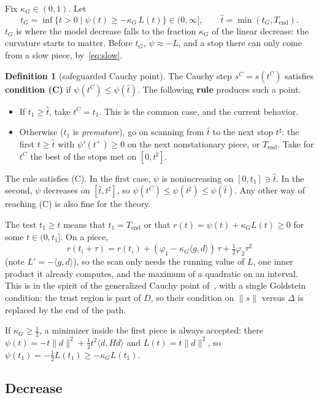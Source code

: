 \documentclass[11pt,a4paper]{article}
\numberwithin{equation}{section}
\theoremstyle{plain}
\theoremstyle{definition}
\newtheorem*{definition*}{Definition}
\theoremstyle{remark}
\newcommand{\inner}[2]{\langle #1,#2\rangle}
\newcommand{\Tend}{T_{\mathrm{end}}}
\newcommand{\kG}{\kappa_G}
\begin{document}
Fix $\kG\in(0,1)$. Let
\[
  t_G=\inf\{t>0\mid\psi(t)\ge-\kG\,L(t)\}\in(0,\infty],\qquad \hat t=\min(t_G,\Tend).
\]
$t_G$ is where the model decrease falls to the fraction $\kG$ of the linear decrease: the
curvature starts to matter. Before $t_G$, $\psi\approx-L$, and a stop there can only come from
a slow piece, by~\eqref{eq:slow}.

\begin{definition*}[safeguarded Cauchy point]
The Cauchy step $s^C=s(t^C)$ satisfies \textbf{condition (C)} if $\psi(t^C)\le\psi(\hat t)$.
The following \textbf{rule} produces such a point.
\begin{itemize}
\item If $t_1\ge\hat t$, take $t^C=t_1$. This is the common case, and the current behavior.
\item Otherwise ($t_1$ is \emph{premature}), go on scanning from $\hat t$ to the next stop
  $t^\sharp$: the first $t\ge\hat t$ with $\psi'(t^+)\ge0$ on the next nonstationary piece, or
  $\Tend$. Take for $t^C$ the best of the stops met on $[0,t^\sharp]$.
\end{itemize}
\end{definition*}

The rule satisfies (C). In the first case, $\psi$ is nonincreasing on $[0,t_1]\ni\hat t$. In
the second, $\psi$ decreases on $[\hat t,t^\sharp]$, so
$\psi(t^C)\le\psi(t^\sharp)\le\psi(\hat t)$. Any other way of reaching (C) is also fine for the
theory.

The test $t_1\ge\hat t$ means that $t_1=\Tend$ or that $r(t)=\psi(t)+\kG L(t)\ge0$ for some
$t\in(0,t_1]$. On a piece,
\[
  r(t_i+\tau)=r(t_i)+(\varphi_1-\kG\inner{g}{d})\,\tau+\tfrac12\varphi_2\tau^2
\]
(note $L'=-\inner{g}{d}$), so the scan only needs the running value of $L$, one inner product
it already computes, and the maximum of a quadratic on an interval. This is in the spirit of
the generalized Cauchy point of~\cite[§12.2]{CGT00}, with a single Goldstein condition: the
trust region is part of $D$, so their condition on $\|s\|$ versus $\Delta$ is replaced by the
end of the path.

If $\kG\ge\frac12$, a minimizer inside the first piece is always accepted: there
$\psi(t)=-t\|d\|^2+\frac12t^2\inner{d}{Hd}$ and $L(t)=t\|d\|^2$, so
$\psi(t_1)=-\frac12L(t_1)\ge-\kG L(t_1)$.

\subsection{Decrease}
\end{document}
